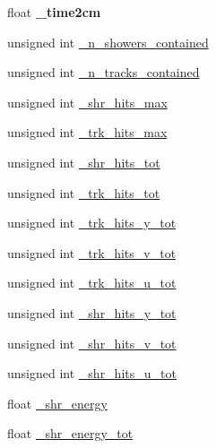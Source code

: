 \begin{DoxyCompactItemize}
\item 
float {\bfseries \+\_\+time2cm}\hypertarget{classselection_1_1CC0piNpSelection_a558b5565d41a4c34a61880faf7ffcf94}{}\label{classselection_1_1CC0piNpSelection_a558b5565d41a4c34a61880faf7ffcf94}

\item 
unsigned int \hyperlink{classselection_1_1CC0piNpSelection_aebf4a69b8d7f3171ad90c382668c22ec}{\+\_\+n\+\_\+showers\+\_\+contained}
\item 
unsigned int \hyperlink{classselection_1_1CC0piNpSelection_a22c5cd4cf8882fa3cbabf25ed86d1f39}{\+\_\+n\+\_\+tracks\+\_\+contained}
\item 
unsigned int \hyperlink{classselection_1_1CC0piNpSelection_a750834ef52299d85f9596bbbafa1dffb}{\+\_\+shr\+\_\+hits\+\_\+max}
\item 
unsigned int \hyperlink{classselection_1_1CC0piNpSelection_a247d186cb641d28f8ea5b02c4f2a39bc}{\+\_\+trk\+\_\+hits\+\_\+max}
\item 
unsigned int \hyperlink{classselection_1_1CC0piNpSelection_aa6e7162371e3e343df001f0afc8a20b8}{\+\_\+shr\+\_\+hits\+\_\+tot}
\item 
unsigned int \hyperlink{classselection_1_1CC0piNpSelection_a420b9962478d7998282e03f1ccf89c2e}{\+\_\+trk\+\_\+hits\+\_\+tot}
\item 
unsigned int \hyperlink{classselection_1_1CC0piNpSelection_a76eb07fcb9190709464880c0ea7c4eba}{\+\_\+trk\+\_\+hits\+\_\+y\+\_\+tot}
\item 
unsigned int \hyperlink{classselection_1_1CC0piNpSelection_a30fe5ccb6a299f7955125aa6c9d5923d}{\+\_\+trk\+\_\+hits\+\_\+v\+\_\+tot}
\item 
unsigned int \hyperlink{classselection_1_1CC0piNpSelection_af7d0e867df8901ff3e531b4c1b96408a}{\+\_\+trk\+\_\+hits\+\_\+u\+\_\+tot}
\item 
unsigned int \hyperlink{classselection_1_1CC0piNpSelection_a6a43c3523af47860ad1682ebe14bb8e3}{\+\_\+shr\+\_\+hits\+\_\+y\+\_\+tot}
\item 
unsigned int \hyperlink{classselection_1_1CC0piNpSelection_ab6aaf4282fa9d2e5971e162c66901227}{\+\_\+shr\+\_\+hits\+\_\+v\+\_\+tot}
\item 
unsigned int \hyperlink{classselection_1_1CC0piNpSelection_afba4a31f84c2f125323b90f007bda1c6}{\+\_\+shr\+\_\+hits\+\_\+u\+\_\+tot}
\item 
float \hyperlink{classselection_1_1CC0piNpSelection_abf854f061d0476dc08ae8b3d71e7a86d}{\+\_\+shr\+\_\+energy}
\item 
float \hyperlink{classselection_1_1CC0piNpSelection_a6e42f011e79f646f36df7148907d1b59}{\+\_\+shr\+\_\+energy\+\_\+tot}

\end{DoxyCompactItemize}

